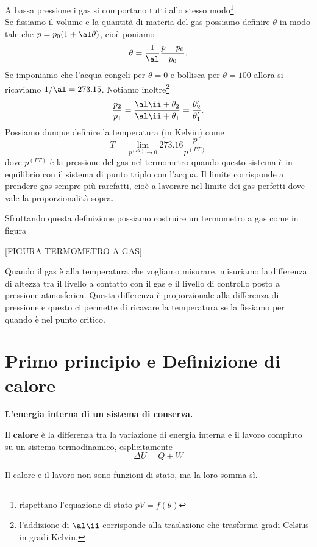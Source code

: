 \noindent
A bassa pressione i gas si comportano tutti allo stesso modo\footnote{rispettano l'equazione di stato $pV=f(\theta)$}.\\
Se fissiamo il volume e la quantit\`a di materia del gas possiamo definire $\theta$ in modo tale che $p=p_0(1+\al\theta)$, cio\`e poniamo 
\[\theta=\frac1\al\frac{p-p_0}{p_0}.\] 
Se imponiamo che l'acqua congeli per $\theta=0$ e bollisca per $\theta=100$ allora si ricaviamo $1/\al=273.15$. Notiamo inoltre\footnote{l'addizione di $\al\ii$ corrisponde alla traslazione che trasforma gradi Celsius in gradi Kelvin.}
\[\frac{p_2}{p_1}=\frac{\al\ii+\theta_2}{\al\ii +\theta_1}=\frac{\theta_2'}{\theta_1'}.\]
Possiamo dunque definire la temperatura (in Kelvin) come
\[T=\lim_{p^{(PT)}\to 0}273.16 \frac{p}{p^{(PT)}}\]
dove $p^{(PT)}$ \`e la pressione del gas nel termometro quando questo sistema \`e in equilibrio con il sistema di punto triplo con l'acqua. Il limite corrisponde a prendere gas sempre pi\`u rarefatti, cio\`e a lavorare nel limite dei gas perfetti dove vale la proporzionalit\`a sopra.
\medskip

\noindent Sfruttando questa definizione possiamo costruire un termometro a gas come in figura

[FIGURA TERMOMETRO A GAS]

\noindent Quando il gas \`e alla temperatura che vogliamo misurare, misuriamo la differenza di altezza tra il livello a contatto con il gas e il livello di controllo posto a pressione atmosferica. 
Questa differenza \`e proporzionale alla differenza di pressione e questo ci permette di ricavare la temperatura se la fissiamo per quando \`e nel punto critico.

\section{Primo principio e Definizione di calore}

\begin{fact}
\textbf{L'energia interna di un sistema di conserva.}
\end{fact}

\begin{definition}[Calore]
Il \textbf{calore} \`e la differenza tra la variazione di energia interna e il lavoro compiuto su un sistema termodinamico, esplicitamente
\[\boxed{\Delta U=Q+W}\]
\end{definition}

\begin{remark}
Il calore e il lavoro non sono funzioni di stato, ma la loro somma s\`i.
\end{remark}

